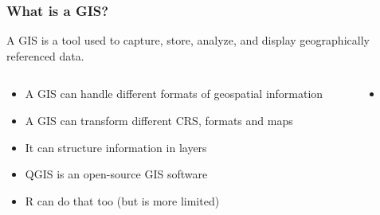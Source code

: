 \documentclass[xcolor=x11names,aspectratio=169, compress]{beamer}
\renewcommand{\(}{\begin{columns}}
\renewcommand{\)}{\end{columns}}
\newcommand{\<}[1]{\begin{column}{#1}}
\renewcommand{\>}{\end{column}}
\begin{document}
\begin{frame}
    \frametitle{What is a GIS?}
A GIS is a tool used to capture, store, analyze, and display geographically referenced data.
\pause
    \begin{columns}[T]
        \begin{column}{0.5\textwidth}
            \begin{itemize}[<+->]
                \item A GIS can handle different formats of  geospatial information
                \item A GIS can transform different CRS, formats and maps
                \item It can structure information in layers
                \item QGIS is an open-source GIS software
                \item R can do that too (but is more limited)
            \end{itemize}
        \end{column}
        \begin{column}{0.5\textwidth}
        \begin{itemize}
             \item[]
\end{itemize}
\end{column}
\end{columns}
\end{frame}
\end{document}
